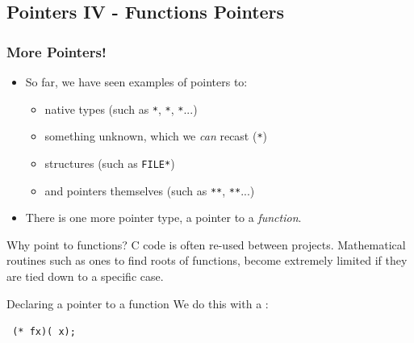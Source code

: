 \documentclass[smaller,handout,table]{beamer}
\begin{document}
\subsection{Pointers IV - Functions Pointers}
\begin{frame}[fragile]
\frametitle{More Pointers!}
\begin{itemize}
\item So far, we have seen examples of pointers to:
\begin{itemize}
\item native types (such as {\tt{}*}, {\tt{}*}, {\tt{}*}...)
\item something unknown, which we \textit{can} recast ({\tt{}*})
\item structures (such as {\tt FILE*})
\item and pointers themselves (such as {\tt{}**}, {\tt{}**}...)
\end{itemize}
\item There is one more pointer type, a pointer to a \emph{function}.
\end{itemize}

\begin{block}{Why point to functions?}
C code is often re-used between projects. Mathematical routines such as ones to find roots of functions, become extremely limited if they are tied down to a specific case.
\end{block}

\begin{exampleblock}{Declaring a pointer to a function}
We do this with a {\tt{}}:
\vspace{-0.1in}
\begin{center}
\tt {}  (* fx)( x);
\end{center}
\end{exampleblock}
\end{frame}
\end{document}
